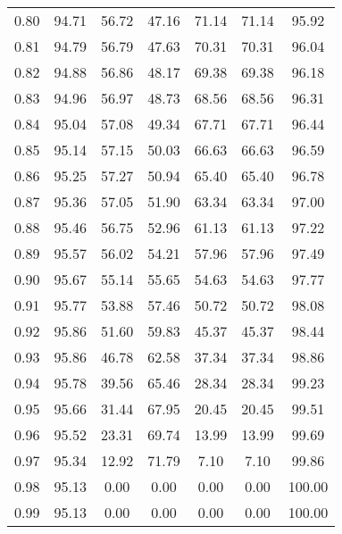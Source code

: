 \begin{tabular}{|c|c|c|c|c|c|c|}
      0.80 &     94.71 &     56.72 &      47.16 &   71.14 &      71.14 &         95.92 \\
      0.81 &     94.79 &     56.79 &      47.63 &   70.31 &      70.31 &         96.04 \\
      0.82 &     94.88 &     56.86 &      48.17 &   69.38 &      69.38 &         96.18 \\
      0.83 &     94.96 &     56.97 &      48.73 &   68.56 &      68.56 &         96.31 \\
      0.84 &     95.04 &     57.08 &      49.34 &   67.71 &      67.71 &         96.44 \\
      0.85 &     95.14 &     57.15 &      50.03 &   66.63 &      66.63 &         96.59 \\
      0.86 &     95.25 &     57.27 &      50.94 &   65.40 &      65.40 &         96.78 \\
      0.87 &     95.36 &     57.05 &      51.90 &   63.34 &      63.34 &         97.00 \\
      0.88 &     95.46 &     56.75 &      52.96 &   61.13 &      61.13 &         97.22 \\
      0.89 &     95.57 &     56.02 &      54.21 &   57.96 &      57.96 &         97.49 \\
      0.90 &     95.67 &     55.14 &      55.65 &   54.63 &      54.63 &         97.77 \\
      0.91 &     95.77 &     53.88 &      57.46 &   50.72 &      50.72 &         98.08 \\
      0.92 &     95.86 &     51.60 &      59.83 &   45.37 &      45.37 &         98.44 \\
      0.93 &     95.86 &     46.78 &      62.58 &   37.34 &      37.34 &         98.86 \\
      0.94 &     95.78 &     39.56 &      65.46 &   28.34 &      28.34 &         99.23 \\
      0.95 &     95.66 &     31.44 &      67.95 &   20.45 &      20.45 &         99.51 \\
      0.96 &     95.52 &     23.31 &      69.74 &   13.99 &      13.99 &         99.69 \\
      0.97 &     95.34 &     12.92 &      71.79 &    7.10 &       7.10 &         99.86 \\
      0.98 &     95.13 &      0.00 &       0.00 &    0.00 &       0.00 &        100.00 \\
      0.99 &     95.13 &      0.00 &       0.00 &    0.00 &       0.00 &        100.00 \\
\bottomrule
\end{tabular}
